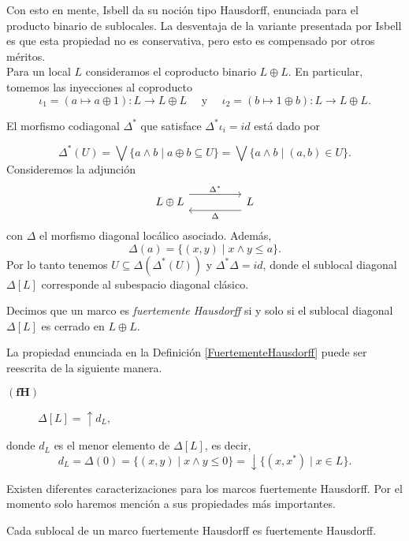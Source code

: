 Con esto en mente, Isbell da su noción tipo Hausdorff, enunciada para el producto binario de sublocales. La desventaja de la variante presentada por Isbell es que esta propiedad no es conservativa, pero esto es compensado por otros méritos.\\

Para un local $L$ consideramos el coproducto binario $L\oplus L$. En particular, tomemos las inyecciones al coproducto
\[
\iota_1=(a\mapsto a\oplus 1)\colon L\to L\oplus L\quad \mbox{ y }\quad \iota_2=(b\mapsto 1\oplus b)\colon L\to L\oplus L.
\]

El morfismo codiagonal $\Delta^*$ que satisface $\Delta^*\iota_i=id$ está dado por

\[
\Delta^*(U)=\bigvee\{a\wedge b\mid a\oplus b\subseteq U\}=\bigvee\{a\wedge b\mid (a, b)\in U\}. 
\]
Consideremos la adjunción
\[\begin{tikzcd}
	{L\oplus L} && L
	\arrow["{\Delta^*}", shift left=3, from=1-1, to=1-3]
	\arrow["\Delta", shift left=3, from=1-3, to=1-1]
\end{tikzcd}\]
con $\Delta$ el morfismo diagonal locálico asociado. Además, 
\[
\Delta(a)=\{(x, y)\mid x\wedge y\leq a\}.
\]
Por lo tanto tenemos $U\subseteq \Delta(\Delta^*(U))$ y $\Delta^*\Delta=id$, donde el sublocal diagonal $\Delta[L]$ corresponde al subespacio diagonal clásico.

\begin{dfn}\label{FuertementeHausdorff}
    Decimos que un marco es \emph{fuertemente Hausdorff} si y solo si el sublocal diagonal $\Delta[L]$ es cerrado en $L\oplus L$.
\end{dfn}

La propiedad enunciada en la Definición \ref{FuertementeHausdorff} puede ser reescrita de la siguiente manera.

\begin{description}
    \item[$\mathbf{(fH)}$] $\Delta[L]=\uparrow d_L$, 
\end{description}
donde $d_L$ es el menor elemento de $\Delta[L]$, es decir,
\[
d_L=\Delta(0)=\{(x, y)\mid x\wedge y\leq 0\}=\downarrow\{(x, x^*)\mid x\in L\}.
\]

Existen diferentes caracterizaciones para los marcos fuertemente Hausdorff. Por el momento solo haremos mención a sus propiedades más importantes.

\begin{prop}\label{Proposicion5.3.4}
    Cada sublocal de un marco fuertemente Hausdorff es fuertemente Hausdorff.
\end{prop}

